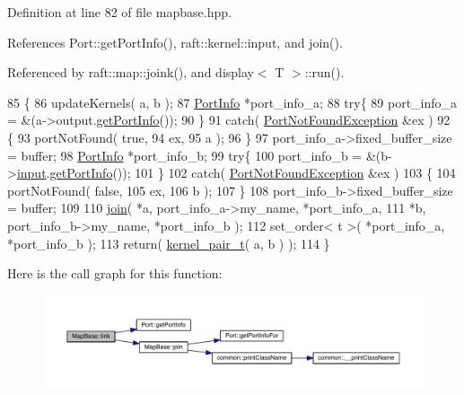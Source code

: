 Definition at line 82 of file mapbase.\+hpp.



References Port\+::get\+Port\+Info(), raft\+::kernel\+::input, and join().



Referenced by raft\+::map\+::joink(), and display$<$ T $>$\+::run().


\begin{DoxyCode}
85    \{
86       updateKernels( a, b );
87       \hyperlink{struct_port_info}{PortInfo} *port\_info\_a;
88       \textcolor{keywordflow}{try}\{ 
89          port\_info\_a =  &(a->output.\hyperlink{class_port_a4af1cb062940ca3b83c569f024b9a8d1}{getPortInfo}());
90       \}
91       \textcolor{keywordflow}{catch}( \hyperlink{class_port_not_found_exception}{PortNotFoundException} &ex )
92       \{
93          portNotFound( \textcolor{keyword}{true},
94                        ex,
95                        a );
96       \}
97       port\_info\_a->fixed\_buffer\_size = buffer;
98       \hyperlink{struct_port_info}{PortInfo} *port\_info\_b;
99       \textcolor{keywordflow}{try}\{
100          port\_info\_b = &(b->\hyperlink{classraft_1_1kernel_a6edbe35a56409d402e719b3ac36d6554}{input}.\hyperlink{class_port_a4af1cb062940ca3b83c569f024b9a8d1}{getPortInfo}());
101       \}
102       \textcolor{keywordflow}{catch}( \hyperlink{class_port_not_found_exception}{PortNotFoundException} &ex )
103       \{
104             portNotFound( \textcolor{keyword}{false}, 
105                           ex,
106                           b );
107       \}
108       port\_info\_b->fixed\_buffer\_size = buffer;
109 
110       \hyperlink{class_map_base_a2624d7b81f0078dcc78e524045403e28}{join}( *a, port\_info\_a->my\_name, *port\_info\_a, 
111             *b, port\_info\_b->my\_name, *port\_info\_b );
112       set\_order< t >( *port\_info\_a, *port\_info\_b ); 
113       \textcolor{keywordflow}{return}( \hyperlink{classkernel__pair__t}{kernel\_pair\_t}( a, b ) );
114    \}
\end{DoxyCode}
Here is the call graph for this function\+:
\nopagebreak
\begin{figure}[H]
\begin{center}
\leavevmode
\includegraphics[width=350pt]{class_map_base_ad98ef02c1651130ad6b565ad156b97c1_cgraph}
\end{center}
\end{figure}
\hypertarget{class_map_base_ad982ebf61439a069ed36dc5f756b732a}{}\label{class_map_base_ad982ebf61439a069ed36dc5f756b732a} 
